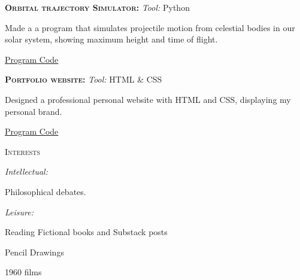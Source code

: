 \documentclass[11pt, a4paper]{article}
\newcommand{\headright}[1]{\vspace*{2.5ex}\textsc{\Large\color{cvblue}#1}\par%
     \vspace*{-2ex}{\color{cvblue}\hrulefill}\par}
\begin{document}
\begin{minipage}[t]{0.56\textwidth}
\textsc{\textbf{Orbital trajectory Simulator:}}
\textit{Tool:} Python

Made a a program that simulates projectile motion from celestial bodies in our solar system, showing maximum height and time of flight.

\href{https://github.com/SamuelIrunguN/PythonProjects/blob/main/projectile.py}{Program Code \faLink}

\textsc{\textbf{Portfolio website:}}
\textit{Tool:} HTML & CSS

Designed a professional personal website with HTML and CSS, displaying my personal brand.

\href{https://github.com/SamuelIrunguN/Portfolio/blob/main/index.html}{Program Code \faLink}




\headright{Interests}

\textit{Intellectual:} 

Philosophical debates.

\textit{Leisure: }

Reading Fictional books and Substack posts

Pencil Drawings

 1960 films



\end{minipage}
\end{document}

